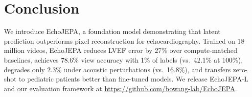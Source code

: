 \documentclass{article}
\theoremstyle{plain}
\theoremstyle{definition}
\theoremstyle{remark}
\begin{document}
\section{Conclusion}
\label{sec:conclusion}

We introduce EchoJEPA, a foundation model demonstrating that latent prediction 
outperforms pixel reconstruction for echocardiography. Trained on 18 million 
videos, EchoJEPA reduces LVEF error by 27\% over compute-matched baselines, 
achieves 78.6\% view accuracy with 1\% of labels (vs.\ 42.1\% at 100\%), 
degrades only 2.3\% under acoustic perturbations (vs.\ 16.8\%), and transfers 
zero-shot to pediatric patients better than fine-tuned models. We release 
EchoJEPA-L and our evaluation framework at \url{https://github.com/bowang-lab/EchoJEPA}.




\end{document}
